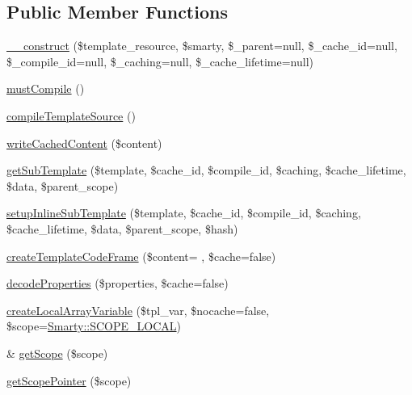 \subsection*{Public Member Functions}
\begin{DoxyCompactItemize}
\item 
\hyperlink{class_smarty___internal___template_af478867e1969367a4fc8bd52c6adcf15}{\+\_\+\+\_\+construct} (\$template\+\_\+resource, \$smarty, \$\+\_\+parent=null, \$\+\_\+cache\+\_\+id=null, \$\+\_\+compile\+\_\+id=null, \$\+\_\+caching=null, \$\+\_\+cache\+\_\+lifetime=null)
\item 
\hyperlink{class_smarty___internal___template_ac46605e0bc23758fe5854820ab1acfe5}{must\+Compile} ()
\item 
\hyperlink{class_smarty___internal___template_a19b86ec88010207709a076c400a8f71f}{compile\+Template\+Source} ()
\item 
\hyperlink{class_smarty___internal___template_a140b8e37db1e66b66728165313a238ab}{write\+Cached\+Content} (\$content)
\item 
\hyperlink{class_smarty___internal___template_a7439be7879d550e2147bca42f796578e}{get\+Sub\+Template} (\$template, \$cache\+\_\+id, \$compile\+\_\+id, \$caching, \$cache\+\_\+lifetime, \$data, \$parent\+\_\+scope)
\item 
\hyperlink{class_smarty___internal___template_a8d1995837954832d7a21f483dbb4d114}{setup\+Inline\+Sub\+Template} (\$template, \$cache\+\_\+id, \$compile\+\_\+id, \$caching, \$cache\+\_\+lifetime, \$data, \$parent\+\_\+scope, \$hash)
\item 
\hyperlink{class_smarty___internal___template_a2235df759b7383ffa06e67552e50f38b}{create\+Template\+Code\+Frame} (\$content= \textquotesingle{}\textquotesingle{}, \$cache=false)
\item 
\hyperlink{class_smarty___internal___template_a5509c666a0574c008bf414536e46b55f}{decode\+Properties} (\$properties, \$cache=false)
\item 
\hyperlink{class_smarty___internal___template_aed5a545506192deb4d793397de1d0b65}{create\+Local\+Array\+Variable} (\$tpl\+\_\+var, \$nocache=false, \$scope=\hyperlink{class_smarty_ae96cd6e8d429b91e56cd1914c5b5ce61}{Smarty\+::\+S\+C\+O\+P\+E\+\_\+\+L\+O\+C\+A\+L})
\item 
\& \hyperlink{class_smarty___internal___template_a2a7191516c110c70a35ab3609ad86233}{get\+Scope} (\$scope)
\item 
\hyperlink{class_smarty___internal___template_a2f4b8f16c5113639e451a4b894b76bfa}{get\+Scope\+Pointer} (\$scope)

\end{DoxyCompactItemize}
